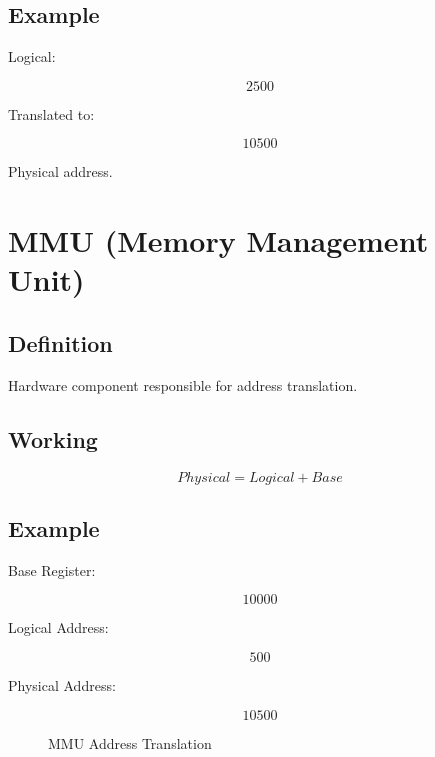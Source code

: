 \subsection{Example}

Logical:

\[
2500
\]

Translated to:

\[
10500
\]

Physical address.

\section{MMU (Memory Management Unit)}

\subsection{Definition}

Hardware component responsible for address translation.

\subsection{Working}

\[
Physical = Logical + Base
\]

\subsection{Example}

Base Register:

\[
10000
\]

Logical Address:

\[
500
\]

Physical Address:

\[
10500
\]

\begin{figure}[H]
\centering
{}
\caption{MMU Address Translation}
\end{figure}

